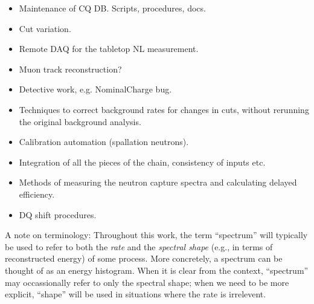 \documentclass[../thesis.tex]{subfiles}
\begin{document}
\begin{itemize}
\item Maintenance of CQ DB. Scripts, procedures, docs.
\item Cut variation.
\item Remote DAQ for the tabletop NL measurement.
\item Muon track reconstruction?
\item Detective work, e.g. NominalCharge bug.
\item Techniques to correct background rates for changes in cuts, without rerunning the original background analysis.
\item Calibration automation (spallation neutrons).
\item Integration of all the pieces of the chain, consistency of inputs etc.
\item Methods of measuring the neutron capture spectra and calculating delayed efficiency.
\item DQ shift procedures.
\end{itemize}

A note on terminology: Throughout this work, the term ``spectrum'' will typically be used to refer to both the \emph{rate} and the \emph{spectral shape} (e.g., in terms of reconstructed energy) of some process. More concretely, a spectrum can be thought of as an energy histogram. When it is clear from the context, ``spectrum'' may occassionally refer to only the spectral shape; when we need to be more explicit, ``shape'' will be used in situations where the rate is irrelevent.
\end{document}
